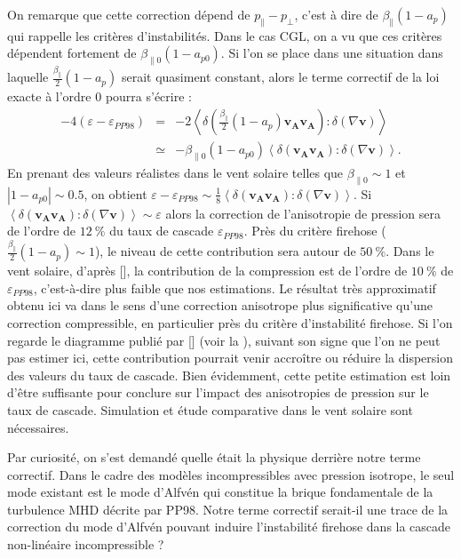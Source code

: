 On remarque que cette correction dépend de $p_{\parallel} - p_{\perp}$, c'est à dire de $\beta_{\parallel} (1-a_p)$ qui rappelle les critères d'instabilités. Dans le cas \ac{CGL}, on a vu que ces critères dépendent fortement de $\beta_{\parallel 0} (1-a_{p0})$. 
Si l'on se place dans une situation dans laquelle $\frac{\beta_{\parallel}}{2}(1 - a_p)$ serait quasiment constant, alors le terme correctif de la loi exacte à l'ordre 0 pourra s'écrire : 
\begin{eqnarray}
\label{eq:turb_cpinc_gyrlin} 
- 4(\varepsilon - \varepsilon_{PP98}) &=& -2 \left< \delta (\frac{\beta_{\parallel}}{2}(1 - a_p)\boldsymbol{v_A}\boldsymbol{v_A}):\delta (\nabla \boldsymbol{v}) \right>\\
&\simeq& - \beta_{\parallel 0}(1 - a_{p0})\left< \delta (\boldsymbol{v_A}\boldsymbol{v_A}):\delta (\nabla \boldsymbol{v}) \right> .
\end{eqnarray}
  En prenant des valeurs réalistes dans le vent solaire telles que  $\beta_{\parallel 0} \sim \num{1}$ et $|1-a_{p0}| \sim \num{0.5}$, on obtient $\varepsilon - \varepsilon_{PP98} \sim \frac{1}{8}\left< \delta (\boldsymbol{v_A}\boldsymbol{v_A}):\delta (\nabla \boldsymbol{v}) \right>  $. Si $\left< \delta (\boldsymbol{v_A}\boldsymbol{v_A}):\delta (\nabla \boldsymbol{v}) \right> \sim \varepsilon$ alors la correction de l'anisotropie de pression sera de l'ordre de $\SI{12}{\%}$ du taux de cascade $\varepsilon_{PP98}$. Près du critère firehose ($\frac{\beta_{\parallel}}{2}(1 - a_p)\sim 1$), le niveau de cette contribution sera autour de $\SI{50}{\%}$. Dans le vent solaire, d'après [\cite{hadid_energy_2017}], la contribution de la compression est de l'ordre de $\SI{10}{\%}$ de $\varepsilon_{PP98}$, c'est-à-dire plus faible que nos estimations. Le résultat très approximatif obtenu ici va dans le sens d'une correction anisotrope plus significative qu'une correction compressible, en particulier près du critère d'instabilité firehose. Si l'on regarde le diagramme publié par [\cite{osman_proton_2013}] (voir la ), suivant son signe que l'on ne peut pas estimer ici, cette contribution pourrait venir accroître ou réduire la dispersion des valeurs du taux de cascade. Bien évidemment, cette petite estimation est loin d'être suffisante pour conclure sur l'impact des anisotropies de pression sur le taux de cascade. Simulation et étude comparative dans le vent solaire sont nécessaires.

Par curiosité, on s'est demandé quelle était la physique derrière notre terme correctif. Dans le cadre des modèles incompressibles avec pression isotrope, le seul mode existant est le mode d'Alfvén qui constitue la brique fondamentale de la turbulence \ac{MHD} décrite par PP98. Notre terme correctif serait-il une trace de la correction du mode d'Alfvén pouvant induire l'instabilité firehose dans la cascade non-linéaire incompressible ? 

